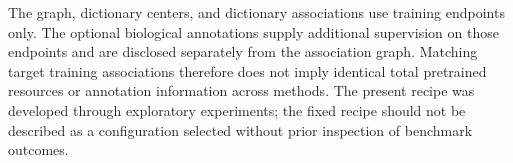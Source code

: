 The graph, dictionary centers, and dictionary associations use training
endpoints only. The optional biological annotations supply additional
supervision on those endpoints and are disclosed separately from the
association graph. Matching target training associations therefore does not
imply identical total pretrained resources or annotation information across
methods. The present recipe was developed through exploratory experiments;
the fixed recipe should not be described as a configuration selected without
prior inspection of benchmark outcomes.
